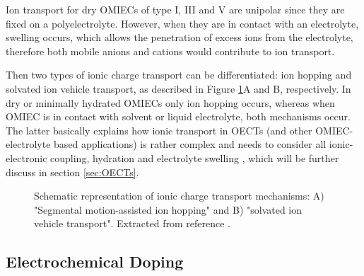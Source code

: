 Ion transport for dry OMIECs of type I, III and V are unipolar since they are fixed on a polyelectrolyte.  However, when they are in contact with an electrolyte, swelling occurs, which allows the penetration of excess ions from the electrolyte, therefore both mobile anions and cations would contribute to ion transport. 

Then two types of ionic charge transport can be differentiated: ion hopping and solvated ion vehicle transport, as described in Figure \ref{fig:itrans}A and B, respectively. In dry or minimally hydrated OMIECs only ion hopping occurs, whereas when OMIEC is in contact with solvent or liquid electrolyte, both mechanisms occur. The latter basically explains how ionic transport in OECTs (and other OMIEC-electrolyte based applications) is rather complex and needs to consider all ionic-electronic coupling, hydration and electrolyte swelling \cite{paulsenOrganicMixedIonic2020}, which will be further discuss in section \ref{sec:OECTs}.

\begin{figure}[ht]
	\centering
	\hspace{2em}
	\caption{Schematic representation of ionic charge transport mechanisms: A) "Segmental motion-assisted ion hopping" and B) "solvated ion vehicle transport". Extracted from reference \cite{paulsenOrganicMixedIonic2020}.}
	\label{fig:itrans}
\end{figure}

\subsection{Electrochemical Doping}

